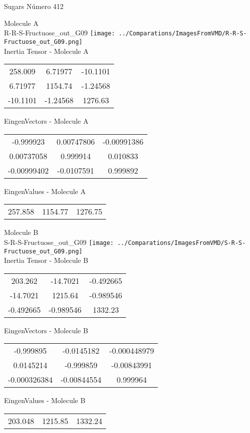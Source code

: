 \vtab[-2cm]
\begin{center}
{\large Sugars \tab Número 412}
\end{center}
\begin{multicols}{2}
\begin{center}

Molecule A \\ 
R-R-S-Fructuose\_out\_G09
\texttt{[image: ../Comparations/ImagesFromVMD/R-R-S-Fructuose\_out\_G09.png]}
\\
Inertia Tensor - Molecule A \\
\vtab

\begin{tabular}{|c c c|}
258.009	 & 	6.71977	 & 	-10.1101	 \\
6.71977	 & 	1154.74	 & 	-1.24568	 \\
-10.1101	 & 	-1.24568	 & 	1276.63
\end{tabular}

\vtab
 EingenVectors - Molecule A     \\
\vtab
\begin{tabular}{|c c c|}
-0.999923	 & 	0.00747806	 & 	-0.00991386	 \\
0.00737058	 & 	0.999914	 & 	0.010833	 \\
-0.00999402	 & 	-0.0107591	 & 	0.999892
\end{tabular}

\vtab
 EingenValues - Molecule A     \\
\vtab
\begin{tabular}{|c c c|}
257.858	 & 	1154.77	 & 	1276.75	 \\
\end{tabular}
\columnbreak

Molecule B \\ 
S-R-S-Fructuose\_out\_G09
\texttt{[image: ../Comparations/ImagesFromVMD/S-R-S-Fructuose\_out\_G09.png]}
\\
Inertia Tensor - Molecule B \\
\vtab

\begin{tabular}{|c c c|}
203.262	 & 	-14.7021	 & 	-0.492665	 \\
-14.7021	 & 	1215.64	 & 	-0.989546	 \\
-0.492665	 & 	-0.989546	 & 	1332.23
\end{tabular}

\vtab
 EingenVectors - Molecule B     \\
\vtab
\begin{tabular}{|c c c|}
-0.999895	 & 	-0.0145182	 & 	-0.000448979	 \\
0.0145214	 & 	-0.999859	 & 	-0.00843991	 \\
-0.000326384	 & 	-0.00844554	 & 	0.999964
\end{tabular}

\vtab
 EingenValues - Molecule B     \\
\vtab
\begin{tabular}{|c c c|}
203.048	 & 	1215.85	 & 	1332.24	 \\
\end{tabular}

\end{center}
\end{multicols}
